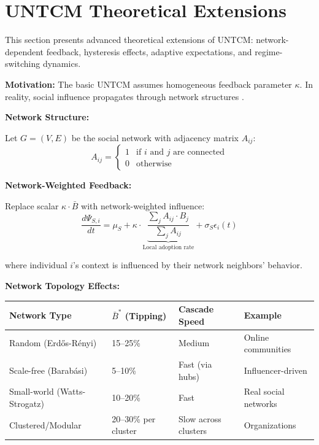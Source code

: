 \section{UNTCM Theoretical Extensions}
\label{sec:untcm-extensions}

This section presents advanced theoretical extensions of UNTCM: network-dependent feedback, hysteresis effects, adaptive expectations, and regime-switching dynamics.

\begin{tcolorbox}[colback=blue!5!white, colframe=blue!75!black,
    title=\textbf{Extension UNTCM-X1: Network-Dependent Feedback}]

\textbf{Motivation:} The basic UNTCM assumes homogeneous feedback parameter $\kappa$. In reality, social influence propagates through network structures \citep{watts2002simple, centola2018behavior}.

\textbf{Network Structure:}

Let $G = (V, E)$ be the social network with adjacency matrix $A_{ij}$:
\begin{equation}
A_{ij} = \begin{cases}
1 & \text{if } i \text{ and } j \text{ are connected} \\
0 & \text{otherwise}
\end{cases}
\end{equation}

\textbf{Network-Weighted Feedback:}

Replace scalar $\kappa \cdot \bar{B}$ with network-weighted influence:
\begin{equation}
\boxed{
\frac{d\Psi_{S,i}}{dt} = \mu_S + \kappa \cdot \underbrace{\frac{\sum_j A_{ij} \cdot B_j}{\sum_j A_{ij}}}_{\text{Local adoption rate}} + \sigma_S \epsilon_i(t)
}
\label{eq:network-feedback}
\end{equation}

where individual $i$'s context is influenced by their network neighbors' behavior.

\textbf{Network Topology Effects:}

\begin{center}
\renewcommand{\arraystretch}{1.3}
\begin{tabular}{@{}llll@{}}
\toprule
\textbf{Network Type} & \textbf{$\bar{B}^*$ (Tipping)} & \textbf{Cascade Speed} & \textbf{Example} \\
\midrule
Random (Erdős-Rényi) & 15--25\% & Medium & Online communities \\
Scale-free (Barabási) & 5--10\% & Fast (via hubs) & Influencer-driven \\
Small-world (Watts-Strogatz) & 10--20\% & Fast & Real social networks \\
Clustered/Modular & 20--30\% per cluster & Slow across clusters & Organizations \\
\bottomrule
\end{tabular}
\end{center}


\end{tcolorbox}
